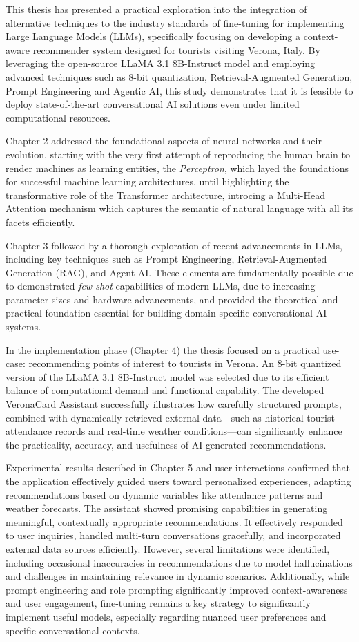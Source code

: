 This thesis has presented a practical exploration into the integration of alternative techniques to the industry standards of fine-tuning for implementing Large Language Models (LLMs), specifically focusing on developing a context-aware recommender system designed for tourists visiting Verona, Italy. By leveraging the open-source LLaMA 3.1 8B-Instruct model and employing advanced techniques such as 8-bit quantization, Retrieval-Augmented Generation, Prompt Engineering and Agentic AI, this study demonstrates that it is feasible to deploy state-of-the-art conversational AI solutions even under limited computational resources.

Chapter 2 addressed the foundational aspects of neural networks and their evolution, starting with the very first attempt of reproducing the human brain to render machines as learning entities, the \textit{Perceptron}, which layed the foundations for successful machine learning architectures, until highlighting the transformative role of the Transformer architecture, introcing a Multi-Head Attention mechanism which captures the semantic of natural language with all its facets efficiently.

Chapter 3 followed by a thorough exploration of recent advancements in LLMs, including key techniques such as Prompt Engineering, Retrieval-Augmented Generation (RAG), and Agent AI. These elements are fundamentally possible due to demonstrated \textit{few-shot} capabilities of modern LLMs, due to increasing parameter sizes and hardware advancements, and provided the theoretical and practical foundation essential for building domain-specific conversational AI systems.

In the implementation phase (Chapter 4) the thesis focused on a practical use-case: recommending points of interest to tourists in Verona. An 8-bit quantized version of the LLaMA 3.1 8B-Instruct model was selected due to its efficient balance of computational demand and functional capability. The developed VeronaCard Assistant successfully illustrates how carefully structured prompts, combined with dynamically retrieved external data—such as historical tourist attendance records and real-time weather conditions—can significantly enhance the practicality, accuracy, and usefulness of AI-generated recommendations.

Experimental results described in Chapter 5 and user interactions confirmed that the application effectively guided users toward personalized experiences, adapting recommendations based on dynamic variables like attendance patterns and weather forecasts. The assistant showed promising capabilities in generating meaningful, contextually appropriate recommendations. It effectively responded to user inquiries, handled multi-turn conversations gracefully, and incorporated external data sources efficiently. However, several limitations were identified, including occasional inaccuracies in recommendations due to model hallucinations and challenges in maintaining relevance in dynamic scenarios. Additionally, while prompt engineering and role prompting significantly improved context-awareness and user engagement, fine-tuning remains a key strategy to significantly implement useful models, especially regarding nuanced user preferences and specific conversational contexts.

